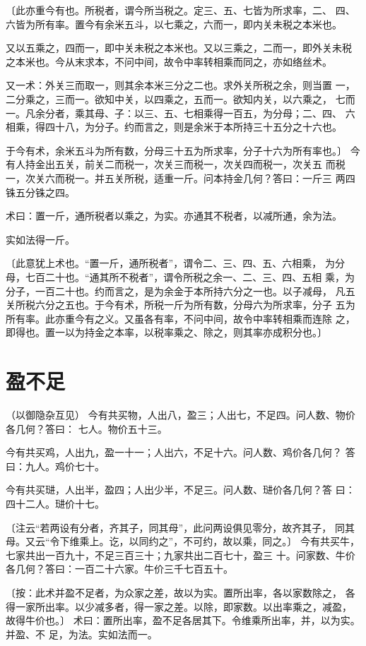 \documentclass[a4paper,12pt,UTF8,twoside]{ctexbook}
\begin{document}
〔此亦重今有也。所税者，谓今所当税之。定三、五、七皆为所求率，二、 四、六皆为所有率。置今有余米五斗，以七乘之，六而一，即内关未税之本米也。

又以五乘之，四而一，即中关未税之本米也。又以三乘之，二而一，即外关未税 之本米也。今从末求本，不问中间，故令中率转相乘而同之，亦如络丝术。

又一术：外关三而取一，则其余本米三分之二也。求外关所税之余，则当置 一，二分乘之，三而一。欲知中关，以四乘之，五而一。欲知内关，以六乘之， 七而一。凡余分者，乘其母、子：以三、五、七相乘得一百五，为分母；二、四、 六相乘，得四十八，为分子。约而言之，则是余米于本所持三十五分之十六也。

于今有术，余米五斗为所有数，分母三十五为所求率，分子十六为所有率也。〕 今有人持金出五关，前关二而税一，次关三而税一，次关四而税一，次关五 而税一，次关六而税一。并五关所税，适重一斤。问本持金几何？答曰：一斤三 两四铢五分铢之四。

术曰：置一斤，通所税者以乘之，为实。亦通其不税者，以减所通，余为法。

实如法得一斤。

〔此意犹上术也。“置一斤，通所税者”，谓令二、三、四、五、六相乘， 为分母，七百二十也。“通其所不税者”，谓令所税之余一、二、三、四、五相 乘，为分子，一百二十也。约而言之，是为余金于本所持六分之一也。以子减母， 凡五关所税六分之五也。于今有术，所税一斤为所有数，分母六为所求率，分子 五为所有率。此亦重今有之义。又虽各有率，不问中间，故令中率转相乘而连除 之，即得也。置一以为持金之本率，以税率乘之、除之，则其率亦成积分也。〕 

\chapter{盈不足}
（以御隐杂互见） 今有共买物，人出八，盈三；人出七，不足四。问人数、物价各几何？答曰： 七人。物价五十三。

今有共买鸡，人出九，盈一十一；人出六，不足十六。问人数、鸡价各几何？ 答曰：九人。鸡价七十。

今有共买琎，人出半，盈四；人出少半，不足三。问人数、琎价各几何？答 曰：四十二人。琎价十七。

〔注云“若两设有分者，齐其子，同其母”，此问两设俱见零分，故齐其子， 同其母。又云“令下维乘上。讫，以同约之”，不可约，故以乘，同之。〕 今有共买牛，七家共出一百九十，不足三百三十；九家共出二百七十，盈三 十。问家数、牛价各几何？答曰：一百二十六家。牛价三千七百五十。

〔按：此术并盈不足者，为众家之差，故以为实。置所出率，各以家数除之， 各得一家所出率。以少减多者，得一家之差。以除，即家数。以出率乘之，减盈， 故得牛价也。〕 术曰：置所出率，盈不足各居其下。令维乘所出率，并，以为实。并盈、不 足，为法。实如法而一。
\end{document}
